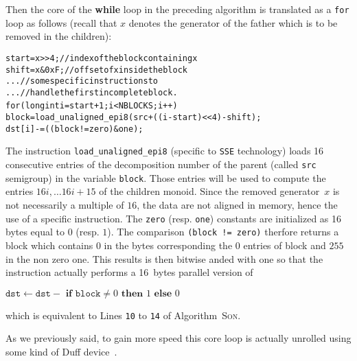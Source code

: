 \documentclass[reqno,11pt]{amsart}
\theoremstyle{plain}
\theoremstyle{definition}
\newcommand{\SSE}{\texttt{SSE}\xspace}
\renewcommand{\tt}[1]{\texttt{#1}}
\begin{document}
Then the core of the \textbf{while} loop in the preceding algorithm is
translated as a \texttt{for} loop as follows (recall that $x$ denotes the generator of
the father which is to be removed in the children):
{
\small
\begin{alltt}
start = x >> 4;      // index of the block containing x
shift = x & 0xF;     // offset of x inside the block
...                  // some specific instructions to
...                  // handle the first incomplete block.
for (long int i=start+1; i<NBLOCKS; i++) {
  block = load_unaligned_epi8(src + ((i-start)<<4) - shift);
  dst[i] -= ((block != zero) & one);
}
\end{alltt}
}
The instruction \tt{load\_unaligned\_epi8} (specific to \SSE technology) loads
 16 consecutive entries of the decomposition number
of the parent (called \tt{src} semigroup) in the variable \tt{block}.
Those entries will be used to compute
the entries $16i, \dots 16i+15$ of the children monoid. Since the removed
generator~$x$ is not necessarily a multiple of $16$, the data are not aligned
in memory, hence the use of a specific instruction. The \tt{zero}
(resp. \tt{one}) constants are initialized as 16 bytes equal to $0$
(resp. $1$). The comparison \tt{(block != zero)} therfore returns a block
which contains $0$ in the bytes corresponding the $0$ entries of block and
$255$ in the non zero one. This results is then bitwise anded with one so that
the instruction actually performs a 16~bytes parallel version of


\begin{center}
$\tt{dst} \gets \tt{dst} -
\textbf{ if } \tt{block} \neq 0 \textbf{ then } 1 \textbf{ else } 0$
\end{center}

which is equivalent to Lines \tt{10} to \tt{14} of Algorithm~\textsc{Son}.
\medskip

As we previously said, to gain more speed this core loop is actually unrolled
using some kind of Duff device~\cite{WikipediaDuff}. 


\end{document}
